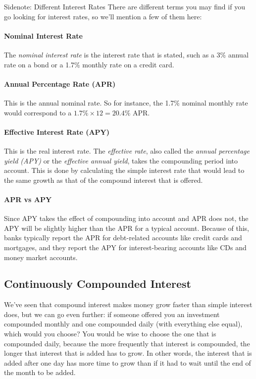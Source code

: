 \begin{proc}{Sidenote: Different Interest Rates}
There are different terms you may find if you go looking for interest rates, so we'll mention a few of them here:

\paragraph{Nominal Interest Rate} The \textit{nominal interest rate} is the interest rate that is stated, such as a 3\% annual rate on a bond or a 1.7\% monthly rate on a credit card.

\paragraph{Annual Percentage Rate (APR)} This is the annual nominal rate.  So for instance, the 1.7\% nominal monthly rate would correspond to a $1.7\% \times 12 = 20.4\%$ APR.

\paragraph{Effective Interest Rate (APY)} This is the real interest rate.  The \textit{effective rate}, also called the \textit{annual percentage yield (APY)} or the \textit{effective annual yield}, takes the compounding period into account.  This is done by calculating the simple interest rate that would lead to the same growth as that of the compound interest that is offered.

\paragraph{APR vs APY} Since APY takes the effect of compounding into account and APR does not, the APY will be slightly higher than the APR for a typical account.  Because of this, banks typically report the APR for debt-related accounts like credit cards and mortgages, and they report the APY for interest-bearing accounts like CDs and money market accounts.
\end{proc}
\vfill
\text{}
\vfill
\pagebreak

\subsection{Continuously Compounded Interest}
We've seen that compound interest makes money grow faster than simple interest does, but we can go even further: if someone offered you an investment compounded monthly and one compounded daily (with everything else equal), which would you choose?  You would be wise to choose the one that is compounded daily, because the more frequently that interest is compounded, the longer that interest that is added has to grow.  In other words, the interest that is added after one day has more time to grow than if it had to wait until the end of the month to be added.

